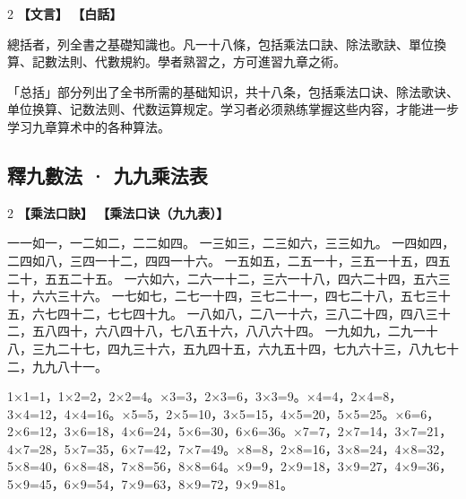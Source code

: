 \documentclass[11pt,a4paper]{article}
\begin{document}
\begin{paracol}{2}
\noindent\textbf{\textcolor{leftlabel}{【文言】}}
\switchcolumn
\noindent\textbf{\textcolor{rightlabel}{【白話】}}
\switchcolumn*

總括者，列全書之基礎知識也。凡一十八條，包括乘法口訣、除法歌訣、單位換算、記數法則、代數規約。學者熟習之，方可進習九章之術。

\switchcolumn

「总括」部分列出了全书所需的基础知识，共十八条，包括乘法口诀、除法歌诀、单位换算、记数法则、代数运算规定。学习者必须熟练掌握这些内容，才能进一步学习九章算术中的各种算法。

\end{paracol}

\medskip

\subsection{釋九數法 · 九九乘法表}

\begin{paracol}{2}
\noindent\textbf{\textcolor{leftlabel}{【乘法口訣】}}
\switchcolumn
\noindent\textbf{\textcolor{rightlabel}{【乘法口诀（九九表）】}}
\switchcolumn*

一一如一，一二如二，二二如四。\break
一三如三，二三如六，三三如九。\break
一四如四，二四如八，三四一十二，四四一十六。\break
一五如五，二五一十，三五一十五，四五二十，五五二十五。\break
一六如六，二六一十二，三六一十八，四六二十四，五六三十，六六三十六。\break
一七如七，二七一十四，三七二十一，四七二十八，五七三十五，六七四十二，七七四十九。\break
一八如八，二八一十六，三八二十四，四八三十二，五八四十，六八四十八，七八五十六，八八六十四。\break
一九如九，二九一十八，三九二十七，四九三十六，五九四十五，六九五十四，七九六十三，八九七十二，九九八十一。

\switchcolumn

1×1=1，1×2=2，2×2=4。×3=3，2×3=6，3×3=9。×4=4，2×4=8，3×4=12，4×4=16。×5=5，2×5=10，3×5=15，4×5=20，5×5=25。×6=6，2×6=12，3×6=18，4×6=24，5×6=30，6×6=36。×7=7，2×7=14，3×7=21，4×7=28，5×7=35，6×7=42，7×7=49。×8=8，2×8=16，3×8=24，4×8=32，5×8=40，6×8=48，7×8=56，8×8=64。×9=9，2×9=18，3×9=27，4×9=36，5×9=45，6×9=54，7×9=63，8×9=72，9×9=81。

\end{paracol}
\end{document}
